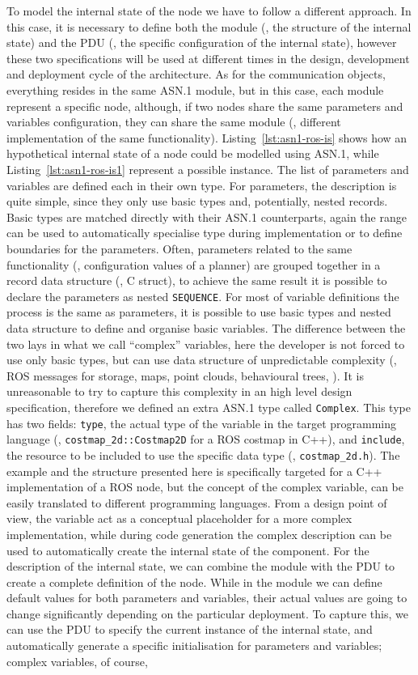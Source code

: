 To model the internal state of the node we have to follow a different approach. In this case, it is necessary to define both the module (\ie, the structure of the internal state) and the PDU (\ie, the specific configuration of the internal state), however these two specifications will be used at different times in the design, development and deployment cycle of the architecture. As for the communication objects, everything resides in the same ASN.1 module, but in this case, each module represent a specific node, although, if two nodes share the same parameters and variables configuration, they can share the same module (\eg, different implementation of the same functionality). Listing~\ref{lst:asn1-ros-is} shows how an hypothetical internal state of a node could be modelled using ASN.1, while Listing~\ref{lst:asn1-ros-is1} represent a possible instance. The list of parameters and variables are defined each in their own type. For parameters, the description is quite simple, since they only use basic types and, potentially, nested records. Basic types are matched directly with their ASN.1 counterparts, again the range can be used to automatically specialise type during implementation or to define boundaries for the parameters. Often, parameters related to the same functionality (\eg, configuration values of a planner) are grouped together in a record data structure (\eg, C struct), to achieve the same result it is possible to declare the parameters as nested \texttt{SEQUENCE}. For most of variable definitions the process is the same as parameters, it is possible to use basic types and nested data structure to define and organise basic variables. The difference between the two lays in what we call ``complex'' variables, here the developer is not forced to use only basic types, but can use data structure of unpredictable complexity (\eg, ROS messages for storage, maps, point clouds, behavioural trees, \etc). It is unreasonable to try to capture this complexity in an high level design specification, therefore we defined an extra ASN.1 type called \texttt{Complex}. This type has two fields: \texttt{type}, the actual type of the variable in the target programming language (\eg, \texttt{costmap\_2d::Costmap2D} for a ROS costmap in C++), and \texttt{include}, the resource to be included to use the specific data type (\eg, \texttt{costmap\_2d.h}). The example and the structure presented here is specifically targeted for a C++ implementation of a ROS node, but the concept of the complex variable, can be easily translated to different programming languages. From a design point of view, the variable act as a conceptual placeholder for a more complex implementation, while during code generation the complex description can be used to automatically create the internal state of the component. For the description of the internal state, we can combine the module with the PDU to create a complete definition of the node. While in the module we can define default values for both parameters and variables, their actual values are going to change significantly depending on the particular deployment. To capture this, we can use the PDU to specify the current instance of the internal state, and automatically generate a specific initialisation for parameters and variables; complex variables, of course, 